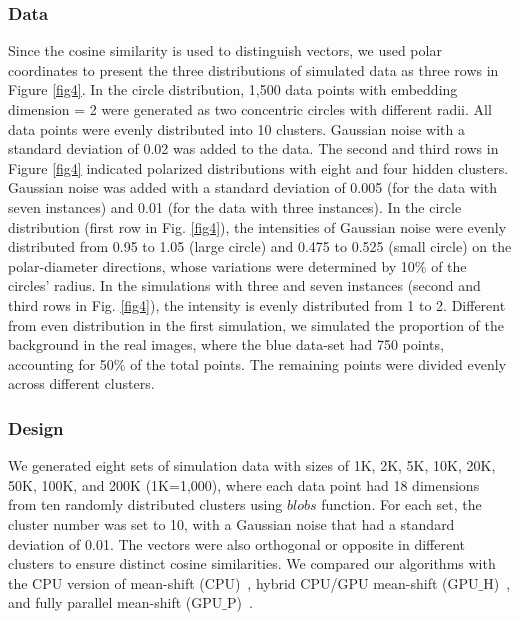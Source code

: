 \documentclass[journal,twoside,web]{ieeecolor}
\begin{document}
\subsubsection{Data}
Since the cosine similarity is used to distinguish vectors, we used polar coordinates to present the three distributions of simulated data as three rows in Figure \ref{fig4}.  In the circle distribution, 1,500 data points with embedding dimension = 2 were generated as two concentric circles with different radii. All data points were evenly distributed into 10 clusters. Gaussian noise with a standard deviation of 0.02 was added to the data. The second and third rows in Figure \ref{fig4} indicated polarized distributions with eight and four hidden clusters. Gaussian noise was added with a standard deviation of 0.005 (for the data with seven instances) and 0.01 (for the data with three instances). In the circle distribution (first row in Fig. \ref{fig4}), the intensities of Gaussian noise were evenly distributed from 0.95 to 1.05 (large circle) and 0.475 to 0.525 (small circle) on the polar-diameter directions, whose variations were determined by 10\% of the circles’ radius. In the simulations with three and seven instances (second and third rows in Fig. \ref{fig4}), the intensity is evenly distributed from 1 to 2. Different from even distribution in the first simulation, we simulated the proportion of the background in the real images, where the blue data-set had 750 points, accounting for 50\% of the total points. The remaining points were divided evenly across different clusters.



\subsubsection{Design}
We generated eight sets of simulation data with sizes of 1K, 2K, 5K, 10K, 20K, 50K, 100K, and 200K (1K=1,000), where each data point had 18 dimensions from ten randomly distributed clusters using $blobs$ function. For each set, the cluster number was set to 10, with a Gaussian noise that had a standard deviation of 0.01. The vectors were also orthogonal or opposite in different clusters to ensure distinct cosine similarities. We compared our algorithms with the CPU version of mean-shift (CPU)~\cite{b33}, hybrid CPU/GPU mean-shift (GPU$\_$H)~\cite{b19}, and fully parallel mean-shift (GPU$\_$P)~\cite{b18}. 
\end{document}
